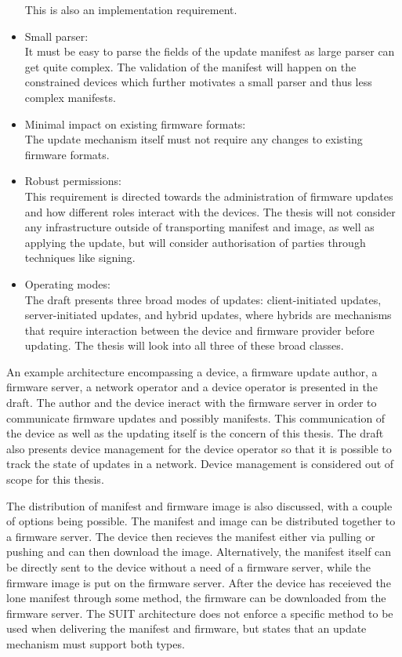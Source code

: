 \documentclass[0-thesis.tex]{subfiles}
\begin{document}
\begin{itemize}
            This is also an implementation requirement.
    \item Small parser:\\
            It must be easy to parse the fields of the update manifest as large parser can 
            get quite complex. The validation of the manifest will happen on the constrained 
            devices which further motivates a small parser and thus less complex manifests.
    \item Minimal impact on existing firmware formats:\\
            The update mechanism itself must not require any changes to existing firmware 
            formats.
    \item Robust permissions:\\
            This requirement is directed towards the administration of firmware updates and 
            how different roles interact with the devices. The thesis will not consider any 
            infrastructure outside of transporting manifest and image, as well as applying 
            the update, but will consider authorisation of parties through techniques like 
            signing.
    \item Operating modes:\\
            The draft presents three broad modes of updates: client-initiated updates, 
            server-initiated updates, and hybrid updates, where hybrids are mechanisms 
            that require interaction between the device and firmware provider before 
            updating. The thesis will look into all three of these broad classes.
\end{itemize}
    
An example architecture encompassing a device, a firmware update author, a firmware server,
a network operator and a device operator is presented in the draft. The author and the device 
ineract with the firmware server in order to communicate firmware updates and possibly 
manifests. This communication of the device as well as the updating itself is the concern 
of this thesis. The draft also presents device management for the device operator so that 
it is possible to track the state of updates in a network. Device management is considered 
out of scope for this thesis.

The distribution of manifest and firmware image is also discussed, with a couple of options 
being possible. The manifest and image can be distributed together to a firmware server. 
The device then recieves the manifest either via pulling or pushing and can then download
the image. Alternatively, the manifest itself can be directly sent to the device without a 
need of a firmware server, while the firmware image is put on the firmware server. After the 
device has receieved the lone manifest through some method, the firmware can be downloaded 
from the firmware server. The SUIT architecture does not enforce a specific method to be used 
when delivering the manifest and firmware, but states that an update mechanism must support 
both types.
\end{document}
